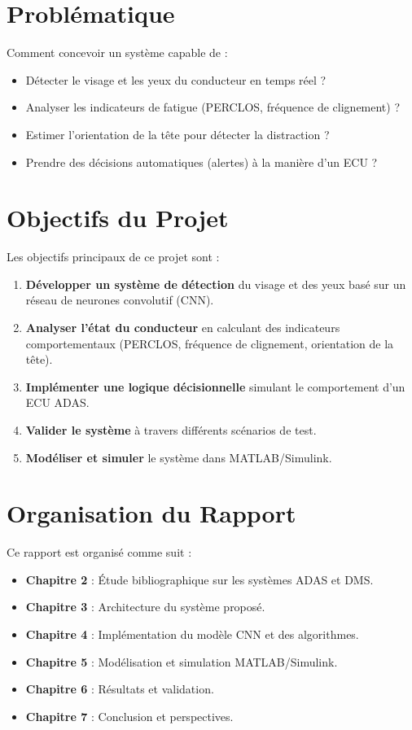 \documentclass[12pt,a4paper]{report}
\begin{document}
\section{Problématique}

Comment concevoir un système capable de :
\begin{itemize}
    \item Détecter le visage et les yeux du conducteur en temps réel ?
    \item Analyser les indicateurs de fatigue (PERCLOS, fréquence de clignement) ?
    \item Estimer l'orientation de la tête pour détecter la distraction ?
    \item Prendre des décisions automatiques (alertes) à la manière d'un ECU ?
\end{itemize}

\section{Objectifs du Projet}

Les objectifs principaux de ce projet sont :
\begin{enumerate}
    \item \textbf{Développer un système de détection} du visage et des yeux basé sur un réseau de neurones convolutif (CNN).
    \item \textbf{Analyser l'état du conducteur} en calculant des indicateurs comportementaux (PERCLOS, fréquence de clignement, orientation de la tête).
    \item \textbf{Implémenter une logique décisionnelle} simulant le comportement d'un ECU ADAS.
    \item \textbf{Valider le système} à travers différents scénarios de test.
    \item \textbf{Modéliser et simuler} le système dans MATLAB/Simulink.
\end{enumerate}

\section{Organisation du Rapport}

Ce rapport est organisé comme suit :
\begin{itemize}
    \item \textbf{Chapitre 2} : Étude bibliographique sur les systèmes ADAS et DMS.
    \item \textbf{Chapitre 3} : Architecture du système proposé.
    \item \textbf{Chapitre 4} : Implémentation du modèle CNN et des algorithmes.
    \item \textbf{Chapitre 5} : Modélisation et simulation MATLAB/Simulink.
    \item \textbf{Chapitre 6} : Résultats et validation.
    \item \textbf{Chapitre 7} : Conclusion et perspectives.
\end{itemize}
\end{document}
